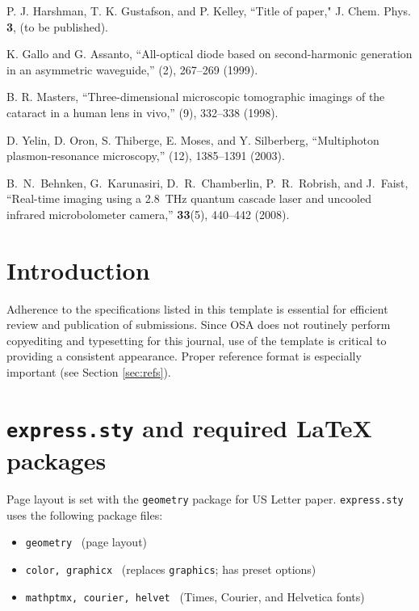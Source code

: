 \documentclass[10pt]{article}
\begin{document}
\begin{thebibliography}{99}
P. J. Harshman, T. K. Gustafson, and P. Kelley, ``Title of paper," J. Chem. Phys. {\bfseries 3}, (to be published).

 K. Gallo and G. Assanto, ``All-optical diode based on second-harmonic generation in an asymmetric waveguide,'' (2), 267--269 (1999).

 B. R. Masters, ``Three-dimensional microscopic tomographic imagings of the cataract in a human lens in vivo,'' (9), 332--338 (1998).

 D. Yelin,  D. Oron,  S. Thiberge,  E. Moses, and Y. Silberberg, ``Multiphoton plasmon-resonance microscopy,'' (12), 1385--1391 (2003).

B.~N.~Behnken, G.~Karunasiri, D.~R.~Chamberlin, P.~R.~Robrish, and J.~Faist,
``Real-time imaging using a 2.8~THz quantum cascade laser and uncooled infrared microbolometer camera,'' \ol \textbf{33}(5), 440--442 (2008).

\end{thebibliography}

\section{Introduction}
Adherence to the specifications listed in this template is essential for efficient review and publication of submissions. Since OSA does not routinely perform copyediting and typesetting for this journal, use of the template is critical to providing a consistent appearance. Proper reference format is especially important (see Section \ref{sec:refs}).

\section{\texttt{express.sty} and required \LaTeX{} packages}
Page layout is set with the \texttt{geometry} package for US Letter paper. \texttt{express.sty} uses the following package files:

\begin{itemize}
\item \texttt{geometry} \ (page layout)
\item \texttt{color, graphicx} \ (replaces \texttt{graphics}; has preset options)
\item \texttt{mathptmx, courier, helvet} \ (Times, Courier, and Helvetica fonts)
\end{itemize}
\end{document}
